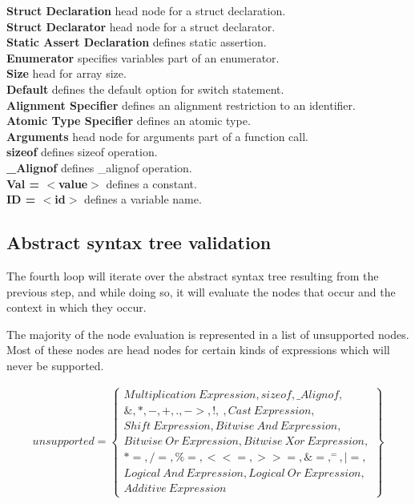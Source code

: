 \documentclass[12pt]{article}
\begin{document}
\begin{multicols}{2}
	\textbf{Struct Declaration} head node for a struct declaration.\\
	\textbf{Struct Declarator} head node for a struct declarator.\\
	\textbf{Static Assert Declaration} defines static assertion.\\
	\textbf{Enumerator} specifies variables part of an enumerator.\\
	\textbf{Size} head for array size.\\
	\textbf{Default} defines the default option for switch statement.\\
	\textbf{Alignment Specifier} defines an alignment restriction to an identifier.\\
	\textbf{Atomic Type Specifier} defines an atomic type.\\
	\textbf{Arguments} head node for arguments part of a function call.\\
	\textbf{sizeof} defines sizeof operation.\\
	\textbf{\_Alignof} defines \_alignof operation.\\
	\textbf{Val = $<$value$>$} defines a constant. \\
	\textbf{ID = $<$id$>$} defines a variable name.
\end{multicols}

\subsection{Abstract syntax tree validation}
The fourth loop will iterate over the abstract syntax tree resulting from the previous step, and while doing so, it will evaluate the nodes that occur and the context in which they occur.

The majority of the node evaluation is represented in a list of unsupported nodes. Most of these nodes are head nodes for certain kinds of expressions which will never be supported.

\begin{align*}
	unsupported = \left\{ \begin{array}{l}
		Multiplication\ Expression, sizeof, \_Alignof, \\
		\&, *, -, +, ., ->, !, ~, Cast\ Expression, \\
		Shift\ Expression, Bitwise\ And\ Expression, \\
		Bitwise\ Or\ Expression, Bitwise\ Xor\ Expression, \\
		*=, /=, \%=, <<=, >>=, \&=, ^=, |=, \\
		Logical\ And\ Expression, Logical\ Or\ Expression, \\
		Additive\ Expression
	\end{array} \right\}
\end{align*}
\end{document}
